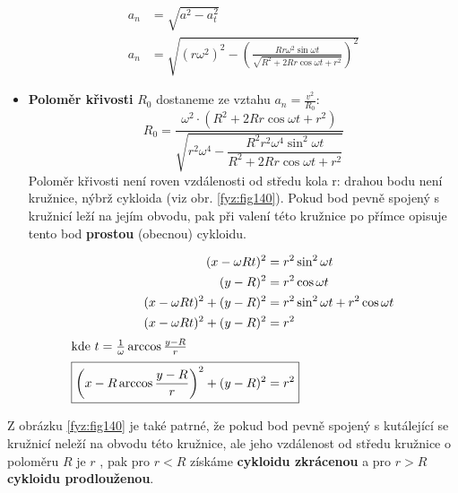 \begin{example}
\begin{itemize}
      \begin{align*}
        a_n &= \sqrt{a^2 - a_t^2}                                                 \\
        a_n &= \sqrt{(r\omega^2)^2-\left(
               \frac{Rr\omega^2\sin\omega t}
                    {\sqrt{R^2 + 2Rr\cos\omega t + r^2}}\right)^2}
      \end{align*}
    \item \textbf{Poloměr křivosti} $R_0$ dostaneme ze vztahu $a_n=\frac{v^2}{R_0}$:
      \begin{equation*}
          R_0 =  \dfrac{\omega^2\cdot(R^2 + 2Rr\cos\omega t + r^2)}{\sqrt{r^2\omega^4 - 
                   \dfrac{R^2r^2\omega^4\sin^2\omega t}{R^2 + 2Rr\cos\omega t + r^2}}}
      \end{equation*}
      Poloměr křivosti není roven vzdálenosti od středu kola r: drahou bodu není kružnice, nýbrž 
      cykloida (viz obr. \ref{fyz:fig140}). Pokud bod pevně spojený s kružnicí leží na 
      jejím obvodu, pak při valení této kružnice po přímce opisuje tento bod \textbf{prostou} 
      (obecnou) cykloidu. 
  \end{itemize}
  
  \begin{align*}
    (x - \omega R t)^2            &= r^2\sin^2\omega t                          \\
    (y-R)^2                       &= r^2\cos\omega t                            \\
    (x - \omega R t)^2 + (y-R)^2  &= r^2\sin^2\omega t + r^2\cos\omega t        \\
    (x - \omega R t)^2 + (y-R)^2  &= r^2 \quad                                  \\
    \shortintertext{kde \(t = \frac{1}{\omega}\arccos\frac{y-R}{r}\)}
    \Aboxed{\left(x - R\arccos\frac{y-R}{r}\right)^2 + (y-R)^2  &= r^2}
  \end{align*}

   {\centering
    \captionsetup{type=figure}
    
    \label{fyz:fig140}
    \par}
    \vspace{1em}
   
   Z obrázku \ref{fyz:fig140} je také patrné, že pokud bod pevně spojený s kutálející se kružnicí 
   neleží na obvodu této kružnice, ale jeho vzdálenost od středu kružnice o poloměru \(R\)  je 
   \(r\) , pak pro \(r<R\) získáme \textbf{cykloidu zkrácenou} a pro \(r>R\)  \textbf{cykloidu 
   prodlouženou}.
      

\end{example}
